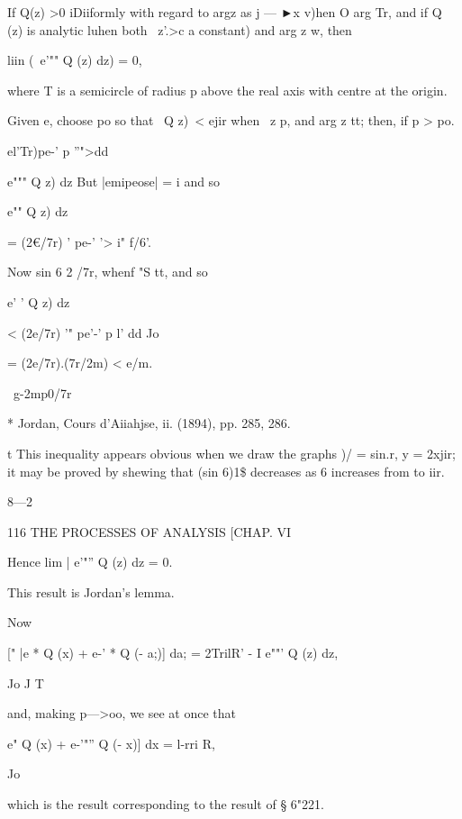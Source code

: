 If Q(z) >0 iDiiformly with regard to argz as j — ►x v)hen O arg Tr,
and if Q (z) is analytic luhen both \ z'.>c a constant) and arg z w,
then

liin (\ e'"" Q (z) dz) = 0,

where T is a semicircle of radius p above the real axis with centre at
the origin.

Given e, choose po so that \ Q z)\ < ejir when \ z p, and arg z tt;
then, if p > po.



 el'Tr)pe-' p ''">dd



e""" Q z) dz But |emipeose| = i and so

e"" Q z) dz



= (2€/7r) ' pe-' '> i" f/6'.



Now sin 6 2 /7r, whenf "S tt, and so



e' ' Q z) dz



< (2e/7r) '" pe'-' p l' dd Jo



= (2e/7r).(7r/2m) < e/m.



\ g-2mp0/7r



* Jordan, Cours d'Aiiahjse, ii. (1894), pp. 285, 286.

t This inequality appears obvious when we draw the graphs )/ = sin.r,
y = 2xjir; it may be proved by shewing that (sin 6)1\$ decreases as 6
increases from to iir.

8—2



116 THE PROCESSES OF ANALYSIS [CHAP. VI



Hence lim | e'"'' Q (z) dz = 0.



This result is Jordan's lemma.

Now

[" |e * Q (x) + e-' * Q (- a;)] da; = 2TrilR' - I e""' Q (z) dz,

Jo J T

and, making p—>oo, we see at once that

 e" Q (x) + e-'"'' Q (- x)] dx = l-rri R,

Jo

which is the result corresponding to the result of § 6"221.

